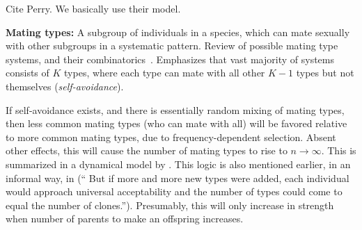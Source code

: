 Cite Perry. We basically use their model.







\textbf{Mating types:} A subgroup of individuals in a species, which can mate sexually with other subgroups in a systematic pattern.  Review of possible mating type systems, and their combinatorics~\cite{bull_combinatorics_1989}. Emphasizes that vast majority of systems consists of $K$ types, where each type can mate with all other $K-1$ types but not themselves (\emph{self-avoidance}).




If self-avoidance exists, and there is essentially random mixing of mating types, then less common mating types (who can mate with all) will be favored relative to more common mating types,  due to frequency-dependent selection. Absent other effects, this will cause the number of mating types to rise to $n\to \infty$.  This is summarized in a dynamical model by \cite{iwasa_evolution_1987}. This logic is also mentioned earlier, in an informal way, in \cite{power_forces_1976} (`` But if more and more new types were added, each individual would approach universal acceptability and the number of types could come to equal the number of clones.''). Presumably, this will only increase in strength when number of parents to make an offspring increases.

